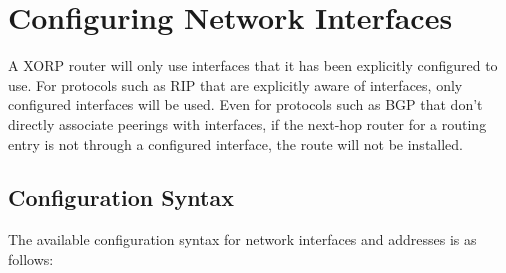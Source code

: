 \newpage
\section{Configuring Network Interfaces}

A XORP router will only use interfaces that it has been explicitly
configured to use. For protocols such as RIP that are explicitly aware
of interfaces, only configured interfaces will be used.  Even for
protocols such as BGP that don't directly associate peerings with
interfaces, if the next-hop router for a routing entry is not through
a configured interface, the route will not be installed.

\subsection{Configuration Syntax}

The available configuration syntax for network interfaces and
addresses is as follows:

\vspace{0.1in}
\noindent{}

